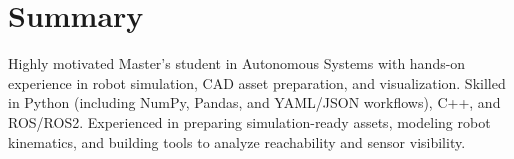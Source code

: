 \section{Summary}
Highly motivated Master’s student in Autonomous Systems with hands-on experience in robot simulation, CAD asset preparation, and visualization. Skilled in Python (including NumPy, Pandas, and YAML/JSON workflows), C++, and ROS/ROS2. Experienced in preparing simulation-ready assets, modeling robot kinematics, and building tools to analyze reachability and sensor visibility.
\vspace{-5pt}